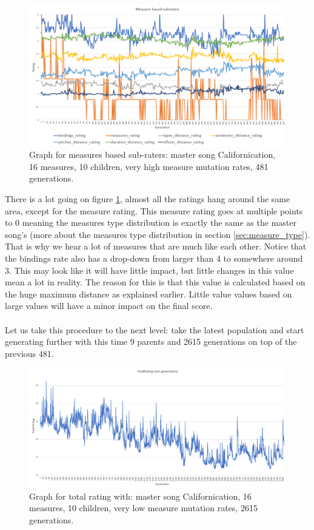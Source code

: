 \documentclass[a4paper]{article}
\begin{document}
\begin{figure}[H]
	\advance\leftskip-1.5cm
	\includegraphics[width=1.2\textwidth]{Fotos/results/rhcp/measures_rating_2.png}
	\caption{Graph for measures based sub-raters: master song Californication, 16 measures, 10 children, very high measure mutation rates, 481 generations.}
	\label{fig:rhcp_2_m}
\end{figure}

There is a lot going on figure \ref{fig:rhcp_2_m}, almost all the ratings hang around the same area, except for the measure rating. This measure rating goes at multiple points to 0 meaning the measures type distribution is exactly the same as the master song's (more about the measures type distribution in section \ref{sec:measure_type}). That is why we hear a lot of measures that are much like each other. Notice that the bindings rate also has a drop-down from larger than 4 to somewhere around 3. This may look like it will have little impact, but little changes in this value mean a lot in reality. The reason for this is that this value is calculated based on the huge maximum distance as explained earlier. Little value values based on large values will have a minor impact on the final score.
\\\\
Let us take this procedure to the next level: take the latest population and start generating further with this time 9 parents and 2615 generations on top of the previous 481. 


\begin{figure}[H]
	\advance\leftskip-1.5cm
	\includegraphics[width=1.2\textwidth]{Fotos/results/rhcp/total_rating_3_graph.png}
	\caption{Graph for total rating with: master song Californication, 16 measures, 10 children, very low measure mutation rates, 2615 generations.}
	\label{fig:rhcp_3}
\end{figure}
\end{document}
